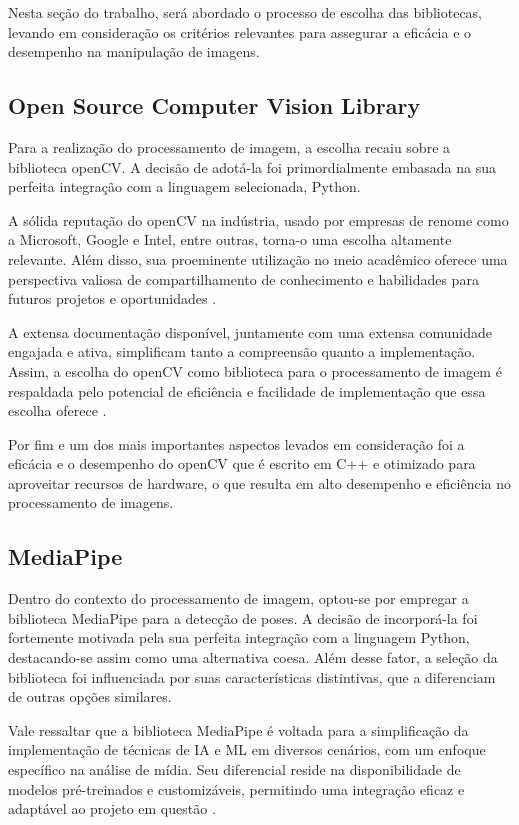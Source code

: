 Nesta seção do trabalho, será abordado o processo de escolha das bibliotecas, levando em consideração os critérios relevantes para assegurar a eficácia e o desempenho na manipulação de imagens.


\subsection{Open Source Computer Vision Library}
Para a realização do processamento de imagem, a escolha recaiu sobre a biblioteca \ac{openCV}. A decisão de adotá-la foi primordialmente embasada na sua perfeita integração com a linguagem selecionada, Python.

A  sólida reputação do \ac{openCV} na indústria, usado por empresas de renome como a Microsoft, Google e Intel, entre outras,  torna-o uma escolha altamente relevante. Além disso, sua proeminente utilização no meio acadêmico oferece uma perspectiva valiosa de compartilhamento de conhecimento e habilidades para futuros projetos e oportunidades \cite{opencv_docs}.
 

A extensa documentação disponível, juntamente com uma extensa comunidade engajada e ativa, simplificam tanto a compreensão quanto a implementação. Assim, a escolha do \ac{openCV} como biblioteca para o processamento de imagem é respaldada pelo potencial de eficiência e facilidade de implementação que essa escolha oferece \cite{opencv_docs}.


Por fim e um dos mais importantes aspectos levados em consideração foi a eficácia e o desempenho do \ac{openCV} que é escrito em C++ e otimizado para aproveitar recursos de hardware, o que resulta em alto desempenho e eficiência no processamento de imagens.


\subsection{MediaPipe}

Dentro do contexto do processamento de imagem, optou-se por empregar a biblioteca MediaPipe para a detecção de poses. A decisão de incorporá-la foi fortemente motivada pela sua perfeita integração com a linguagem Python, destacando-se assim como uma alternativa coesa. Além desse fator, a seleção da biblioteca foi influenciada por suas características distintivas, que a diferenciam de outras opções similares.

Vale ressaltar que a biblioteca MediaPipe é voltada para a simplificação da implementação de técnicas de \ac{IA} e \ac{ML} em diversos cenários, com um enfoque específico na análise de mídia. Seu diferencial reside na disponibilidade de modelos pré-treinados e customizáveis, permitindo uma integração eficaz e adaptável ao projeto em questão \cite{mediapipe_guide}.

